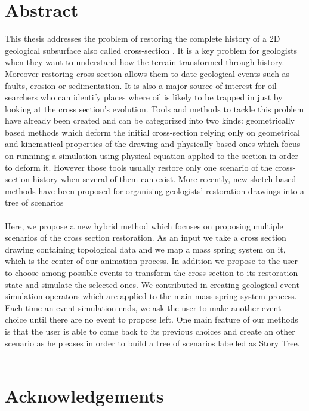 \documentclass[12pt, a4paper]{report} %
\begin{document}



\chapter*{Abstract}

This thesis addresses the problem of restoring the complete history of a 2D geological 
subsurface also called cross-section \cite{BalancedCrossSections}. It is a key problem for geologists when they want to understand how the terrain transformed through history. Moreover restoring cross section allows them to date geological events such as faults, erosion or sedimentation. It is also a major source of interest for oil searchers who can identify places where oil is likely to be trapped in just by looking at the cross section's evolution. Tools and methods to tackle this problem have already been created and can  be categorized into two kinds: geometrically based methods which deform the initial cross-section relying only on geometrical and kinematical properties of the drawing and physically based ones which focus on runninng a simulation using physical equation applied to the section in order to deform it. However those tools usually restore only one scenario of the cross-section history when several of them can exist. More recently, new sketch based methods have been proposed for organising geologists' restoration drawings into a tree of scenarios\\\\
 Here, we propose a new hybrid method which focuses on proposing multiple scenarios of the cross section restoration. As an input we take a cross section drawing containing topological data and we map a mass spring system on it, which is the center of our animation process. In addition we propose to the user to choose among possible events to transform the cross section to its restoration state and simulate the selected ones. We contributed in creating geological event simulation operators which are applied to the main mass spring system process. Each time an event simulation ends, we ask the user to make another event choice until there are no event to propose left. One main feature of our methods is that the user is able to come back to its previous choices and create an other scenario as he pleases in order to build a tree of scenarios labelled as Story Tree.\\\\
\newpage
\chapter*{Acknowledgements}
\end{document}
